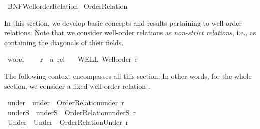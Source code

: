 %
\begin{isabellebody}%
%
%
\isadelimdocument
%
\endisadelimdocument
%
\isatagdocument
%
\isamarkuptrue%
%
\endisatagdocument
{\isafolddocument}%
%
\isadelimdocument
%
\endisadelimdocument
%
\isadelimtheory
%
\endisadelimtheory
%
\isatagtheory
{}\isamarkupfalse%
\ BNF{\isacharunderscore}{\kern0pt}Wellorder{\isacharunderscore}{\kern0pt}Relation\isanewline
{}\ Order{\isacharunderscore}{\kern0pt}Relation\isanewline
{}%
\endisatagtheory
{\isafoldtheory}%
%
\isadelimtheory
%
\endisadelimtheory
%
\begin{isamarkuptext}%
In this section, we develop basic concepts and results pertaining
to well-order relations.  Note that we consider well-order relations
as {\em non-strict relations},
i.e., as containing the diagonals of their fields.%
\end{isamarkuptext}\isamarkuptrue%
\isamarkupfalse%
\ wo{\isacharunderscore}{\kern0pt}rel\ {\isacharequal}{\kern0pt}\isanewline
\ \ \ r\ {\isacharcolon}{\kern0pt}{\isacharcolon}{\kern0pt}\ {\isachardoublequoteopen}{\isacharprime}{\kern0pt}a\ rel{\isachardoublequoteclose}\isanewline
\ \ \ WELL{\isacharcolon}{\kern0pt}\ {\isachardoublequoteopen}Well{\isacharunderscore}{\kern0pt}order\ r{\isachardoublequoteclose}\isanewline
{}%
\begin{isamarkuptext}%
The following context encompasses all this section. In other words,
for the whole section, we consider a fixed well-order relation .%
\end{isamarkuptext}\isamarkuptrue%
\isamarkupfalse%
\ under\ \ {\isachardoublequoteopen}under\ {\isasymequiv}\ Order{\isacharunderscore}{\kern0pt}Relation{\isachardot}{\kern0pt}under\ r{\isachardoublequoteclose}\isanewline
{}\isamarkupfalse%
\ underS\ \ {\isachardoublequoteopen}underS\ {\isasymequiv}\ Order{\isacharunderscore}{\kern0pt}Relation{\isachardot}{\kern0pt}underS\ r{\isachardoublequoteclose}\isanewline
{}\isamarkupfalse%
\ Under\ \ {\isachardoublequoteopen}Under\ {\isasymequiv}\ Order{\isacharunderscore}{\kern0pt}Relation{\isachardot}{\kern0pt}Under\ r{\isachardoublequoteclose}\isanewline
{}\isamarkupfalse%

\end{isabellebody}
